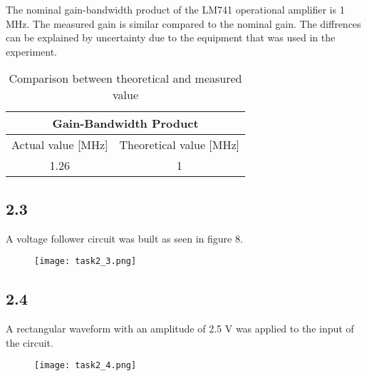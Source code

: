     The nominal gain-bandwidth product of the LM741 operational amplifier is 1 MHz. The measured gain is similar compared to the nominal gain. The diffrences can be explained by uncertainty due to the equipment that was used in the experiment.

    \begin{table}[htbp]
     \centering
       \begin{tabular}{c|c}
        \multicolumn{2}{c}{Gain-Bandwidth Product}\\
        \hline
        Actual value [MHz] & Theoretical value [MHz] \\
       \hline
        1.26          & 1 \\
       \end{tabular}%
     \caption{Comparison between theoretical and measured value}
     \label{tab:addlabel}%
   \end{table}%

\subsection*{2.3}

    A voltage follower circuit was built as seen in figure 8.\\
    
    \begin{figure}[h!]
        \centering
        \texttt{[image: task2\_3.png]}
    \end{figure}


\subsection*{2.4}

    A rectangular waveform with an amplitude of 2.5 V was applied to the input of the circuit.\\

    \begin{figure}[h!]
        \centering
        \texttt{[image: task2\_4.png]}
    \end{figure}

